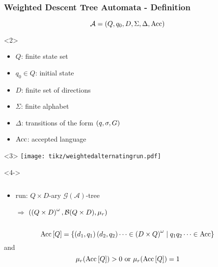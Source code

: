 \documentclass{beamer}
\begin{document}
  \begin{frame}
    \frametitle{Weighted Descent Tree Automata - Definition}
    \begin{equation*}
      \mathcal{A} = \left(Q, q_{0}, D, \Sigma, \Delta, \operatorname{Acc}\right)
    \end{equation*}
    \begin{overlayarea}{\textwidth}{0.8\textheight}
      \begin{onlyenv}<2>
        \begin{itemize}
          \item $Q$: finite state set
          \item $q_{0}\in Q$: initial state
          \item $D$: finite set of directions
          \item $\Sigma$: finite alphabet
          \item $\Delta$: transitions of the form $\left(q, \sigma, G\right)$
          \item $\operatorname{Acc}$: accepted language
        \end{itemize}
      \end{onlyenv}
      \begin{onlyenv}<3>
        \texttt{[image: tikz/weightedalternatingrun.pdf]}
      \end{onlyenv}
      \begin{onlyenv}<4->
        \begin{columns}
          \begin{column}{0.5\textwidth}
            \begin{itemize}
              \item run: $Q\times D$-ary 
                $\mathcal{G}(\mathcal{A})$-tree
              \item[$\Rightarrow$] $
                \left(\left(Q\times D\right)^{\omega}, 
                \mathcal{B}(Q\times D), \mu_{r}\right)
                $
            \end{itemize}
          \end{column}
          \begin{column}{0.5\textwidth}
          \end{column}
        \end{columns}
        \begin{equation*}
          \operatorname{Acc}\left[Q\right] = \left\{
            \left(d_{1}, q_{1}\right)\left(d_{2}, q_{2}\right)\dots\in
            \left(D\times Q\right)^{\omega}\mid q_{1}q_{2}\dots\in\operatorname{Acc}
          \right\}
        \end{equation*}
        and
        \begin{equation*}
          \mu_{r}(\operatorname{Acc}\left[Q\right]) > 0\text{ or }\mu_{r}(\operatorname{Acc}\left[Q\right]) = 1
        \end{equation*}
      \end{onlyenv}
    \end{overlayarea}
  \end{frame}
\end{document}
